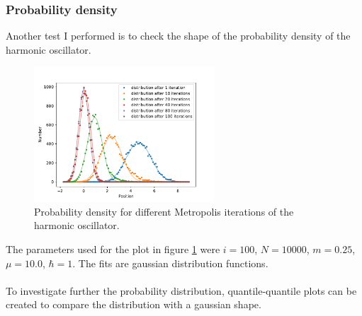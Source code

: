 \documentclass{scrartcl}
\begin{document}
	\subsubsection{Probability density}
		Another test I performed is to check the shape of the probability density of the harmonic oscillator.
		\begin{figure}[H]
			\centering
				\includegraphics[width=0.6\textwidth]{../imgs/harmonic_oscillator_track/track_10010000_gauss_1_fit.pdf}
			\caption{Probability density for different Metropolis iterations of the harmonic oscillator.}
			\label{fig:harmonic_oscillator_track_10010000_gauss_1_fit}
		\end{figure}
		The parameters used for the plot in figure \ref{fig:harmonic_oscillator_track_10010000_gauss_1_fit} were $i=100$, $N=10000$, $m=0.25$, $\mu = 10.0$, $\hbar = 1$.
		The fits are gaussian distribution functions.
		\\\\
		To investigate further the probability distribution, quantile-quantile plots can be created to compare the distribution with a gaussian shape.
\end{document}
